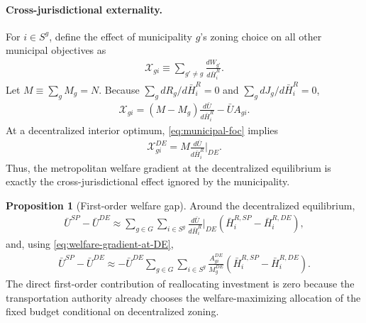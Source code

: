 \documentclass[12pt, a4paper]{article}
\theoremstyle{definition}
\newtheorem{proposition}{Proposition}
\theoremstyle{remark}
\begin{document}
\paragraph{Cross-jurisdictional externality.}
For $i\in S^g$, define the effect of municipality $g$'s zoning choice on all other municipal objectives as
\begin{align}
    \label{eq:zoning-externality}
    \mathcal X_{gi}
    \equiv
    \sum_{g'\neq g}
    \frac{dW_{g'}}{d\bar H_i^R}.
\end{align}
Let $M\equiv\sum_gM_g=N$. Because $\sum_g dR_g/d\bar H_i^R=0$ and $\sum_g dJ_g/d\bar H_i^R=0$,
\begin{align}
    \label{eq:zoning-externality-expanded}
    \mathcal X_{gi}
    =
    (M-M_g)\frac{d\bar U}{d\bar H_i^R}
    -
    \bar U A_{gi}.
\end{align}
At a decentralized interior optimum, \eqref{eq:municipal-foc} implies
\begin{align}
    \label{eq:zoning-externality-at-DE}
    \mathcal X_{gi}^{DE}
    =
    M\frac{d\bar U}{d\bar H_i^R}\bigg|_{DE}.
\end{align}
Thus, the metropolitan welfare gradient at the decentralized equilibrium is exactly the cross-jurisdictional effect ignored by the municipality.

\begin{proposition}[First-order welfare gap]
\label{prop:SP-gap}
Around the decentralized equilibrium,
\begin{align}
    \bar U^{SP}-\bar U^{DE}
    \approx
    \sum_{g\in G}
    \sum_{i\in S^g}
    \frac{d\bar U}{d\bar H_i^R}\bigg|_{DE}
    \left(
    \bar H_i^{R,SP}-\bar H_i^{R,DE}
    \right),
\end{align}
and, using \eqref{eq:welfare-gradient-at-DE},
\begin{align}
    \bar U^{SP}-\bar U^{DE}
    \approx
    -
    \bar U^{DE}
    \sum_{g\in G}
    \sum_{i\in S^g}
    \frac{A_{gi}^{DE}}{M_g^{DE}}
    \left(
    \bar H_i^{R,SP}-\bar H_i^{R,DE}
    \right).
\end{align}
The direct first-order contribution of reallocating investment is zero because the transportation authority already chooses the welfare-maximizing allocation of the fixed budget conditional on decentralized zoning.
\end{proposition}
\end{document}
